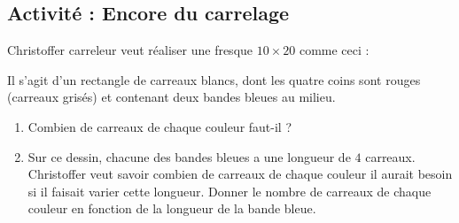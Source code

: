 
\subsection*{Activité : Encore du carrelage}





Christoffer carreleur veut réaliser une fresque \( 10\times 20\) comme ceci :
\begin{center}
   
\end{center}
Il s'agit d'un rectangle de carreaux blancs, dont les quatre coins sont rouges (carreaux grisés) et contenant deux bandes bleues au milieu.

\begin{enumerate}
    \item
        Combien de carreaux de chaque couleur faut-il ?
    \item
        Sur ce dessin, chacune des bandes bleues a une longueur de \( 4\) carreaux. Christoffer veut savoir combien de carreaux de chaque couleur il aurait besoin si il faisait varier cette longueur. Donner le nombre de carreaux de chaque couleur en fonction de la longueur de la bande bleue.
\end{enumerate}
